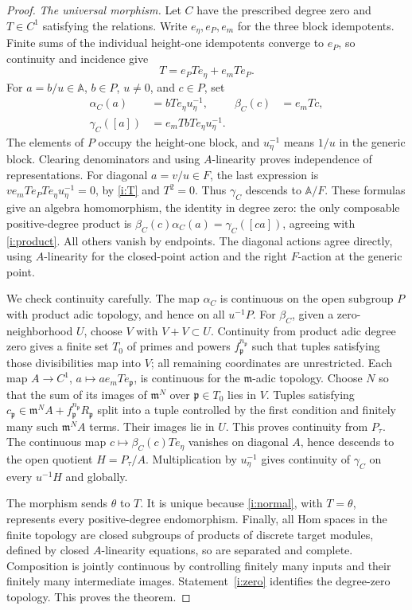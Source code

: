 \begin{proof}
\emph{The universal morphism.}
Let $C$ have the prescribed degree zero and $T\in C^1$ satisfying
the relations. Write $e_\eta,e_P,e_m$ for the three block
idempotents. Finite sums of the individual height-one idempotents
converge to $e_P$, so continuity and incidence give
\begin{equation}\label{i:T}
 T=e_PTe_\eta+e_mTe_P.
\end{equation}
For $a=b/u\in\mathbb A$, $b\in P$, $u\ne0$, and $c\in P$, set
\begin{align}\label{i:normal}
 \alpha_C(a)&=bTe_\eta u_\eta^{-1},&
 \beta_C(c)&=e_mTc,\\
 \gamma_C([a])&=e_mTbTe_\eta u_\eta^{-1}.\nonumber
\end{align}
The elements of $P$ occupy the height-one block, and $u_\eta^{-1}$
means $1/u$ in the generic block. Clearing denominators and using
$A$-linearity proves independence of representations. For diagonal
$a=v/u\in F$, the last expression is
$v e_mTe_PTe_\eta u_\eta^{-1}=0$, by \eqref{i:T} and $T^2=0$.
Thus $\gamma_C$ descends to $\mathbb A/F$.
These formulas give an algebra homomorphism, the identity in degree
zero: the only composable positive-degree product is
$\beta_C(c)\alpha_C(a)=\gamma_C([ca])$, agreeing with
\eqref{i:product}. All others vanish by endpoints. The diagonal
actions agree directly, using $A$-linearity for the closed-point
action and the right $F$-action at the generic point.

We check continuity carefully. The map $\alpha_C$ is continuous
on the open subgroup $P$ with product adic topology, and hence on all
$u^{-1}P$. For $\beta_C$, given a zero-neighborhood $U$, choose
$V$ with $V+V\subset U$. Continuity from product adic degree zero
gives a finite set $T_0$ of primes and powers
$f_{\mathfrak p}^{n_{\mathfrak p}}$ such that tuples satisfying
those divisibilities map into $V$; all remaining coordinates are
unrestricted. Each map
$A\to C^1$, $a\mapsto a e_mTe_{\mathfrak p}$, is continuous
for the $\mathfrak m$-adic topology. Choose $N$ so that the sum of
its images of $\mathfrak m^N$ over $\mathfrak p\in T_0$ lies
in $V$. Tuples satisfying
$c_{\mathfrak p}\in\mathfrak m^N A+
f_{\mathfrak p}^{n_{\mathfrak p}}R_{\mathfrak p}$ split into a
tuple controlled by the first condition and finitely many such
$\mathfrak m^N A$ terms. Their images lie in $U$. This proves
continuity from $P_\tau$.
The continuous map $c\mapsto\beta_C(c)Te_\eta$ vanishes on
diagonal $A$, hence descends to the open quotient $H=P_\tau/A$.
Multiplication by $u_\eta^{-1}$ gives continuity of $\gamma_C$
on every $u^{-1}H$ and globally.

The morphism sends $\theta$ to $T$. It is unique because
\eqref{i:normal}, with $T=\theta$, represents every positive-degree
endomorphism. Finally, all Hom spaces in the finite topology are
closed subgroups of products of discrete target modules, defined by
closed $A$-linearity equations, so are separated and complete.
Composition is jointly continuous by controlling finitely many inputs
and their finitely many intermediate images. Statement~\ref{i:zero}
identifies the degree-zero topology. This proves the theorem.
\end{proof}

